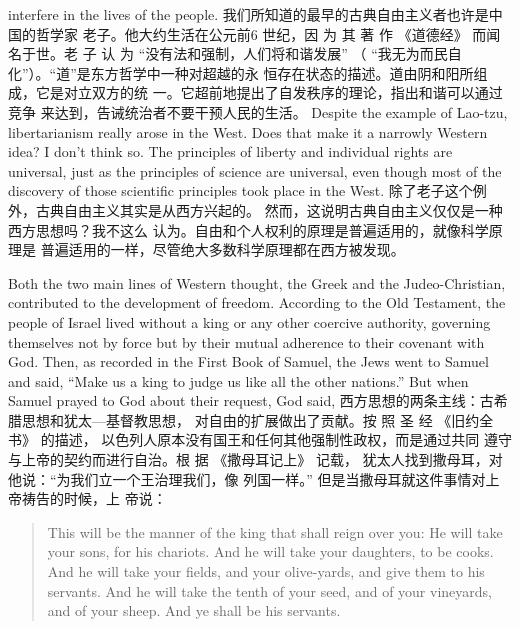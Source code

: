 \begin{paracol}{2}
interfere in the lives of the people.
\switchcolumn
我们所知道的最早的古典自由主义者也许是中国的哲学家
老子。他大约生活在公元前6 世纪，因 为 其 著 作 《道德经》
而闻名于世。老 子 认 为 “没有法和强制，人们将和谐发展”
（ “我无为而民自化”）。“道”是东方哲学中一种对超越的永
恒存在状态的描述。道由阴和阳所组成，它是对立双方的统
一。它超前地提出了自发秩序的理论，指出和谐可以通过竞争
来达到，告诫统治者不要干预人民的生活。
\switchcolumn*
Despite the example of Lao-tzu, libertarianism really arose in
the West. Does that make it a narrowly Western idea? I don't
think so. The principles of liberty and individual rights are universal, just as the principles of science are universal, even
though most of the discovery of those scientific principles took
place in the West.
\switchcolumn
除了老子这个例外，古典自由主义其实是从西方兴起的。
然而，这说明古典自由主义仅仅是一种西方思想吗？我不这么
认为。自由和个人权利的原理是普遍适用的，就像科学原理是
普遍适用的一样，尽管绝大多数科学原理都在西方被发现。

Both the two main lines of Western thought, the Greek and the
Judeo-Christian, contributed to the development of freedom.
According to the Old Testament, the people of Israel lived
without a king or any other coercive authority, governing themselves not by force but by their mutual adherence to their
covenant with God. Then, as recorded in the First Book of
Samuel, the Jews went to Samuel and said, ``Make us a king to
judge us like all the other nations.'' But when Samuel prayed to
God about their request, God said,
\switchcolumn
西方思想的两条主线：古希腊思想和犹太---基督教思想，
对自由的扩展做出了贡献。按 照 圣 经 《旧约全书》 的描述，
以色列人原本没有国王和任何其他强制性政权，而是通过共同
遵守与上帝的契约而进行自治。根 据 《撒母耳记上》 记载，
犹太人找到撒母耳，对他说：“为我们立一个王治理我们，像
列国一样。” 但是当撒母耳就这件事情对上帝祷告的时候，上
帝说：
\switchcolumn*
\begin{quotation}
	This will be the manner of the king that shall reign over you: He
	will take your sons, for his chariots. And he will take your daughters, to be cooks. And he will take your fields, and your olive-yards, and give them to his servants. And he will take the tenth
	of your seed, and of your vineyards, and of your sheep. And ye
	shall be his servants.
	

\end{quotation}
\end{paracol}
